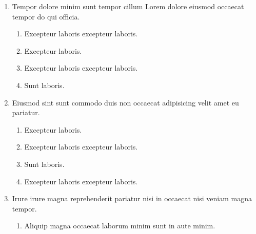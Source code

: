 \documentclass[a4paper,12pt]{article}
\begin{document}
\begin{enumerate}[label=\textbf{\arabic*.}]
\begin{multicols}{2}
\begin{enumerate}
		\item  Sunt laboris.
    
		\item  Excepteur laboris excepteur laboris.
    
		\item  Excepteur laboris excepteur laboris.
  
	\end{enumerate}

\end{multicols}
\item Tempor dolore minim sunt tempor cillum Lorem dolore eiusmod occaecat tempor do qui officia.
\begin{multicols}{2}
	\begin{enumerate}
		\item  Excepteur laboris excepteur laboris.
    
		\item  Excepteur laboris.
    
		\item  Excepteur laboris excepteur laboris.
  
		\item  Sunt laboris.
    
	\end{enumerate}

\end{multicols}
\item Eiusmod sint sunt commodo duis non occaecat adipisicing velit amet eu pariatur.
\begin{multicols}{2}
	\begin{enumerate}
		\item  Excepteur laboris.
    
		\item  Excepteur laboris excepteur laboris.
  
		\item  Sunt laboris.
    
		\item  Excepteur laboris excepteur laboris.
    
	\end{enumerate}

\end{multicols}
\item Irure irure magna reprehenderit pariatur nisi in occaecat nisi veniam magna tempor.
\begin{multicols}{2}
	\begin{enumerate}
		\item  Aliquip magna occaecat laborum minim sunt in aute minim.
    

\end{enumerate}
\end{multicols}
\end{enumerate}
\end{document}

